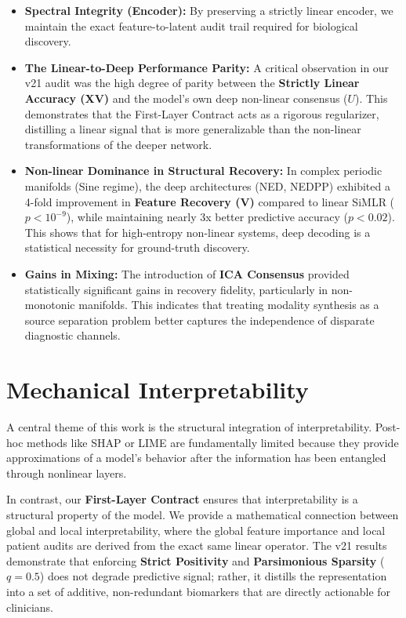\documentclass[
  letterpaper,
]{report}
\providecommand{\tightlist}{%
  \setlength{\itemsep}{0pt}\setlength{\parskip}{0pt}}
\begin{document}
\begin{itemize}
\tightlist
\item
  \textbf{Spectral Integrity (Encoder):} By preserving a strictly linear
  encoder, we maintain the exact feature-to-latent audit trail required
  for biological discovery.
\item
  \textbf{The Linear-to-Deep Performance Parity:} A critical observation
  in our v21 audit was the high degree of parity between the
  \textbf{Strictly Linear Accuracy (XV)} and the model's own deep
  non-linear consensus (\(U\)). This demonstrates that the First-Layer
  Contract acts as a rigorous regularizer, distilling a linear signal
  that is more generalizable than the non-linear transformations of the
  deeper network.
\item
  \textbf{Non-linear Dominance in Structural Recovery:} In complex
  periodic manifolds (Sine regime), the deep architectures (NED, NEDPP)
  exhibited a 4-fold improvement in \textbf{Feature Recovery (V)}
  compared to linear SiMLR (\(p < 10^{-9}\)), while maintaining nearly
  3x better predictive accuracy (\(p < 0.02\)). This shows that for
  high-entropy non-linear systems, deep decoding is a statistical
  necessity for ground-truth discovery.
\item
  \textbf{Gains in Mixing:} The introduction of \textbf{ICA Consensus}
  provided statistically significant gains in recovery fidelity,
  particularly in non-monotonic manifolds. This indicates that treating
  modality synthesis as a source separation problem better captures the
  independence of disparate diagnostic channels.
\end{itemize}

\section{Mechanical Interpretability}\label{mechanical-interpretability}

A central theme of this work is the structural integration of
interpretability. Post-hoc methods like SHAP or LIME are fundamentally
limited because they provide approximations of a model's behavior after
the information has been entangled through nonlinear layers.

In contrast, our \textbf{First-Layer Contract} ensures that
interpretability is a structural property of the model. We provide a
mathematical connection between global and local interpretability, where
the global feature importance and local patient audits are derived from
the exact same linear operator. The v21 results demonstrate that
enforcing \textbf{Strict Positivity} and \textbf{Parsimonious Sparsity}
(\(q=0.5\)) does not degrade predictive signal; rather, it distills the
representation into a set of additive, non-redundant biomarkers that are
directly actionable for clinicians.
\end{document}
